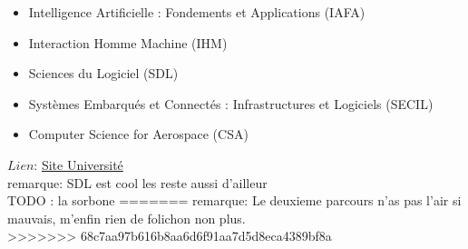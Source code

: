 \documentclass[a4paper,11pt]{article}
\begin{document}
\begin{enumerate}
                    \begin{itemize}
                        \item Intelligence Artificielle : Fondements et Applications (IAFA)
                        \item Interaction Homme Machine (IHM)
                        \item Sciences du Logiciel (SDL)
                        \item Systèmes Embarqués et Connectés : Infrastructures et Logiciels (SECIL)
                        \item Computer Science for Aerospace (CSA)
                    \end{itemize}
                    $Lien$: \href{https://departement-informatique.univ-tlse3.fr/master/master-informatique-2021-2026/}{Site Université}
                    \\ remarque: SDL est cool les reste aussi d'ailleur
\\TODO : la sorbone
=======
                remarque: Le deuxieme parcours n'as pas l'air si mauvais, m'enfin rien de folichon non plus.
                \\



>>>>>>> 68c7aa97b616b8aa6d6f91aa7d5d8eca4389bf8a
    \end{enumerate}
\end{document}
